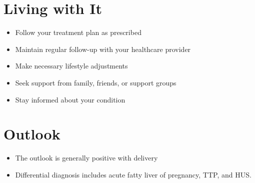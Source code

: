 \section{Living with It}
\begin{itemize}[noitemsep]
  \item Follow your treatment plan as prescribed
  \item Maintain regular follow-up with your healthcare provider
  \item Make necessary lifestyle adjustments
  \item Seek support from family, friends, or support groups
  \item Stay informed about your condition
\end{itemize}
\section{Outlook}
\begin{itemize}[noitemsep]
  \item The outlook is generally positive with delivery
  \item Differential diagnosis includes acute fatty liver of pregnancy, TTP, and HUS.
\end{itemize}
